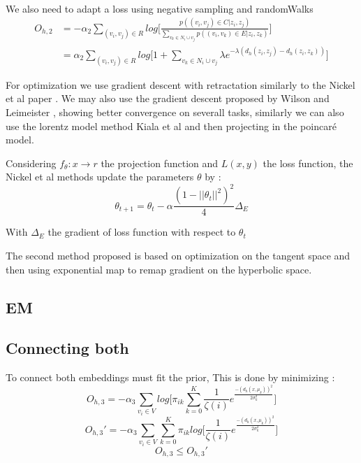 \documentclass{article}
\begin{document}
            \paragraph{}
            We also need to adapt a loss using negative sampling and randomWalks
            \begin{align*}
                O_{h,2} &= - \alpha_2 \sum_{(v_i,v_j)\in R} log\Bigg[ \frac{p((v_i,v_j)\in C | z_i, z_j)}{\sum\limits_{v_k \in N_i \cup v_j}p((v_i,v_k)\in E | z_i, z_k)}\Bigg] \\
                  & = \alpha_2 \sum_{(v_i,v_j)\in R} log \Bigg[1 + \sum\limits_{v_k \in N_i \cup v_j} \lambda e^{-\lambda(d_h(z_i,z_j) - d_h(z_i,z_k))} \Bigg]
            \end{align*}

            For optimization we use gradient descent with retractation similarly to the Nickel et al paper \cite{poincareWTV}.
            We may also use the gradient descent proposed by Wilson and Leimeister \cite{PoincareGradient}, showing better convergence on severall tasks, similarly we can also use the lorentz model method Kiala et al \cite{LorentzEmbeddings} and then projecting in the poincaré model.

            Considering $f_\theta: x \rightarrow r $ the projection function and $L(x,y)$ the loss function, the Nickel et al methods update the parameters $\theta$ by :
            $$
                \theta_{t+1} = \theta_{t} - \alpha \frac{(1- ||\theta_t||^2)^2 }{4}\Delta_E
            $$

            With $\Delta_E$ the gradient of loss function with respect to $\theta_t$

            The second method proposed is based on optimization on the tangent space and then using exponential map to remap gradient on the hyperbolic space. 
            \subsection{EM}


            \subsection{Connecting both}
                
                To connect both embeddings must fit the prior,
                This is done by minimizing :
                $$
                    O_{h,3} = -\alpha_3   \sum_{v_i\in V} log\Bigg[ \pi_{ik}\sum \limits_{k=0}^K \frac{1}{\zeta(i)}e^{\frac{-(d_h(x,\mu_k))^2}{2\sigma_k^2}}\Bigg]
                $$
                $$
                    O_{h,3}' =-\alpha_3  \sum_{v_i\in V}  \sum \limits_{k=0}^K \pi_{ik} log\Bigg[\frac{1}{\zeta(i)}e^{\frac{-(d_h(x,\mu_k))^2}{2\sigma_k^2}}\Bigg]
                $$
                $$
                    O_{h,3} \leq O_{h,3}' 
                $$
\end{document}

